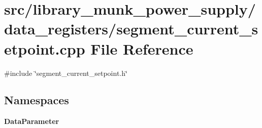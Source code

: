 \section{src/library\+\_\+munk\+\_\+power\+\_\+supply/data\+\_\+registers/segment\+\_\+current\+\_\+setpoint.cpp File Reference}
\label{segment__current__setpoint_8cpp}
{\ttfamily \#include \char`\"{}segment\+\_\+current\+\_\+setpoint.\+h\char`\"{}}\newline
\subsection*{Namespaces}
\begin{DoxyCompactItemize}
\item 
 \textbf{ Data\+Parameter}
\end{DoxyCompactItemize}
